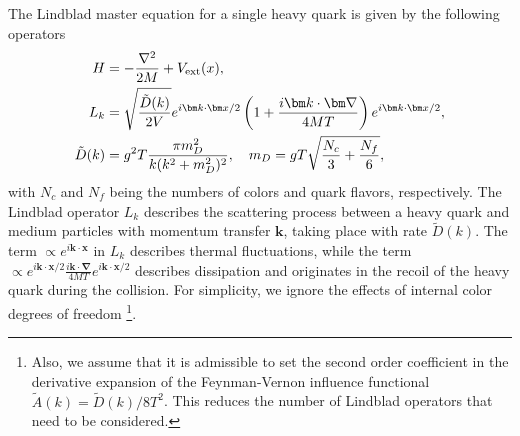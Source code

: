 \documentclass[prd,11pt, amsmath, amsymb, aps, reprint, tightenlines, nofootinbib, longbibliography, abbrv, preprintnumbers]{revtex4-1}
\begin{document}
The Lindblad master equation for a single heavy quark is given by the following operators \cite{Akamatsu:2014qsa}
\begin{subequations}
\label{eq:QCDLindblad}
\begin{align}
H &= -\frac{\nabla^2}{2M} + V_{\rm ext}(x), \\
L_{k} &= \sqrt{\frac{\tilde D(k)}{2V}} e^{i\bm k \cdot \bm x/2}\left(1+\frac{i\bm k \cdot\bm\nabla}{4MT}\right)e^{i\bm k \cdot \bm x/2},\\
\tilde D(k) &= g^2 T\frac{\pi m_D^2}{k(k^2 + m_D^2)^2}, \quad
m_D = gT\sqrt{\frac{N_c}{3} + \frac{N_f}{6}},
\end{align}
\end{subequations}
with $N_c$ and $N_f$ being the numbers of colors and quark flavors, respectively.
The Lindblad operator $L_k$ describes the scattering process between a heavy quark and medium particles with momentum transfer $\bm k$, taking place with rate $\tilde D(k)$.
The term $\propto e^{i\bm k \cdot\bm x}$ in $L_k$ describes thermal fluctuations, while the term $\propto e^{i\bm k \cdot\bm x/2}\frac{i\bm k\cdot\bm\nabla}{4MT}e^{i\bm k \cdot\bm x/2}$ describes dissipation and originates in the recoil of the heavy quark during the collision. For simplicity, we ignore the effects of internal color degrees of freedom
\footnote{
Also, we assume that it is admissible to set the second order coefficient in the derivative expansion of the Feynman-Vernon influence functional $\tilde A(k) = \tilde D(k)/8T^2$. This reduces the number of Lindblad operators that need to be considered.
}.
\end{document}
